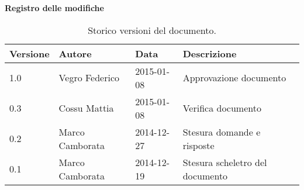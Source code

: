 \begin{Large}
	\textbf{Registro delle modifiche}
\end{Large}

\begin{table}[h]
\begin{center}
\begin{tabular}{|l|l|l|l|}
\hline
\textbf{Versione} & \textbf{Autore} & \textbf{Data} & \textbf{Descrizione} \\
\hline
1.0 & Vegro Federico & 2015-01-08 & Approvazione documento \\
\hline
0.3 & Cossu Mattia & 2015-01-08 & Verifica documento \\
\hline
0.2 & Marco Camborata & 2014-12-27 & Stesura domande e risposte \\
\hline
0.1 & Marco Camborata & 2014-12-19 & Stesura scheletro del documento \\
\hline
\end{tabular}
\caption{Storico versioni del documento.}
\end{center}
\end{table}
